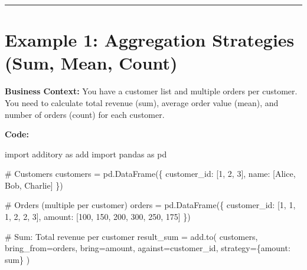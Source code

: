 \documentclass[
  letterpaper,
]{scrbook}
\newenvironment{Shaded}{\begin{snugshade}}{\end{snugshade}}
\newcommand{\CommentTok}[1]{\textcolor[rgb]{0.37,0.37,0.37}{#1}}
\newcommand{\DecValTok}[1]{\textcolor[rgb]{0.68,0.00,0.00}{#1}}
\newcommand{\ImportTok}[1]{\textcolor[rgb]{0.00,0.46,0.62}{#1}}
\newcommand{\NormalTok}[1]{\textcolor[rgb]{0.00,0.23,0.31}{#1}}
\newcommand{\OperatorTok}[1]{\textcolor[rgb]{0.37,0.37,0.37}{#1}}
\newcommand{\StringTok}[1]{\textcolor[rgb]{0.13,0.47,0.30}{#1}}
\begin{document}
\begin{center}\rule{0.5\linewidth}{0.5pt}\end{center}

\section{Example 1: Aggregation Strategies (Sum, Mean,
Count)}\label{example-1-aggregation-strategies-sum-mean-count}

\textbf{Business Context:} You have a customer list and multiple orders
per customer. You need to calculate total revenue (sum), average order
value (mean), and number of orders (count) for each customer.

\textbf{Code:}

\begin{Shaded}
\begin{Highlighting}[]
\ImportTok{import}\NormalTok{ additory }\ImportTok{as}\NormalTok{ add}
\ImportTok{import}\NormalTok{ pandas }\ImportTok{as}\NormalTok{ pd}

\CommentTok{\# Customers}
\NormalTok{customers }\OperatorTok{=}\NormalTok{ pd.DataFrame(\{}
    \StringTok{\textquotesingle{}customer\_id\textquotesingle{}}\NormalTok{: [}\DecValTok{1}\NormalTok{, }\DecValTok{2}\NormalTok{, }\DecValTok{3}\NormalTok{],}
    \StringTok{\textquotesingle{}name\textquotesingle{}}\NormalTok{: [}\StringTok{\textquotesingle{}Alice\textquotesingle{}}\NormalTok{, }\StringTok{\textquotesingle{}Bob\textquotesingle{}}\NormalTok{, }\StringTok{\textquotesingle{}Charlie\textquotesingle{}}\NormalTok{]}
\NormalTok{\})}

\CommentTok{\# Orders (multiple per customer)}
\NormalTok{orders }\OperatorTok{=}\NormalTok{ pd.DataFrame(\{}
    \StringTok{\textquotesingle{}customer\_id\textquotesingle{}}\NormalTok{: [}\DecValTok{1}\NormalTok{, }\DecValTok{1}\NormalTok{, }\DecValTok{1}\NormalTok{, }\DecValTok{2}\NormalTok{, }\DecValTok{2}\NormalTok{, }\DecValTok{3}\NormalTok{],}
    \StringTok{\textquotesingle{}amount\textquotesingle{}}\NormalTok{: [}\DecValTok{100}\NormalTok{, }\DecValTok{150}\NormalTok{, }\DecValTok{200}\NormalTok{, }\DecValTok{300}\NormalTok{, }\DecValTok{250}\NormalTok{, }\DecValTok{175}\NormalTok{]}
\NormalTok{\})}

\CommentTok{\# Sum: Total revenue per customer}
\NormalTok{result\_sum }\OperatorTok{=}\NormalTok{ add.to(}
\NormalTok{    customers,}
\NormalTok{    bring\_from}\OperatorTok{=}\NormalTok{orders,}
\NormalTok{    bring}\OperatorTok{=}\StringTok{\textquotesingle{}amount\textquotesingle{}}\NormalTok{,}
\NormalTok{    against}\OperatorTok{=}\StringTok{\textquotesingle{}customer\_id\textquotesingle{}}\NormalTok{,}
\NormalTok{    strategy}\OperatorTok{=}\NormalTok{\{}\StringTok{\textquotesingle{}amount\textquotesingle{}}\NormalTok{: }\StringTok{\textquotesingle{}sum\textquotesingle{}}\NormalTok{\}}
\NormalTok{)}


\end{Highlighting}
\end{Shaded}
\end{document}
